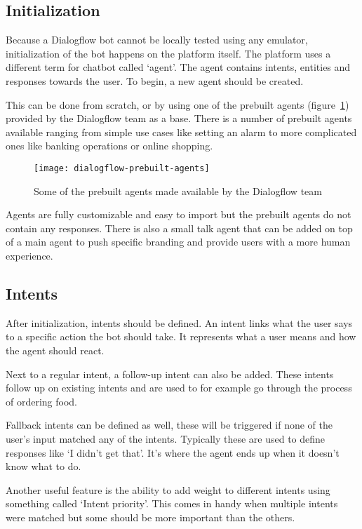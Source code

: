 \subsection{Initialization}

Because a Dialogflow bot cannot be locally tested using any emulator, initialization of the bot happens on the platform itself. The platform uses a different term for chatbot called `agent'. The agent contains intents, entities and responses towards the user. To begin, a new agent should be created.

This can be done from scratch, or by using one of the prebuilt agents (figure~\ref{fig:dialogflow-prebuilt-agents}) provided by the Dialogflow team as a base. There is a number of prebuilt agents available ranging from simple use cases like setting an alarm to more complicated ones like banking operations or online shopping.

\begin{figure}[ht]
	\centering
	\texttt{[image: dialogflow-prebuilt-agents]}
	\caption{Some of the prebuilt agents made available by the Dialogflow team}
	\label{fig:dialogflow-prebuilt-agents}
\end{figure}

Agents are fully customizable and easy to import but the prebuilt agents do not contain any responses. There is also a small talk agent that can be added on top of a main agent to push specific branding and provide users with a more human experience.

\subsection{Intents}

After initialization, intents should be defined. An intent links what the user says to a specific action the bot should take. It represents what a user means and how the agent should react.

Next to a regular intent, a follow-up intent can also be added. These intents follow up on existing intents and are used to for example go through the process of ordering food.

Fallback intents can be defined as well, these will be triggered if none of the user's input matched any of the intents. Typically these are used to define responses like `I didn't get that'. It's where the agent ends up when it doesn't know what to do.

Another useful feature is the ability to add weight to different intents using something called `Intent priority'. This comes in handy when multiple intents were matched but some should be more important than the others.

